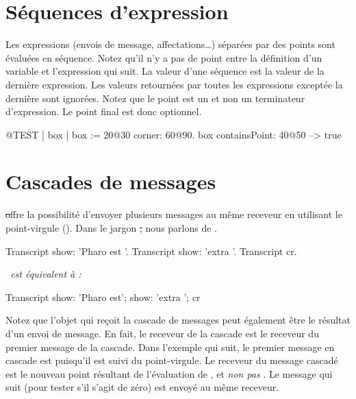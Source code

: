 \documentclass[a4paper,10pt,twoside]{book}
\begin{document}
\section{S\'equences d'expression}
Les expressions (\ie envois de message, affectations\ldots) s\'epar\'ees par des points sont \'evalu\'ees en s\'equence.
Notez qu'il n'y a pas de point entre la d\'efinition d'un variable et l'expression qui suit.
La valeur d'une s\'equence est la valeur de la derni\`ere
expression. Les valeurs retourn\'ees par toutes les expressions
except\'ee la derni\`ere sont ignor\'ees. Notez que le point est un 
et non un terminateur d'expression. Le point final est donc optionnel.

\begin{code}{@TEST}
| box |
box := 20@30 corner: 60@90.
box containsPoint: 40@50 --> true
\end{code}

\section{Cascades de messages}
\st offre la possibilit\'e d'envoyer plusieurs messages au m\^eme
receveur en utilisant le point-virgule (\ct{;}). Dans le jargon \st,
nous parlons de .


\begin{minipage}{0.35\textwidth}
\begin{code}{}
Transcript show: 'Pharo est '.
Transcript show: 'extra '.
Transcript cr.
\end{code}
\end{minipage}
\emph{~est \'equivalent \`a :~}
\begin{minipage}{0.35\textwidth}
\begin{code}{}
Transcript        
   show: 'Pharo est';
   show: 'extra ';
   cr
\end{code}
\end{minipage}

Notez que l'objet qui re\c{c}oit la cascade de messages peut \'egalement \^etre le r\'esultat d'un envoi de message.
En fait, le receveur de la cascade est le receveur du premier message
de la cascade. Dans l'exemple qui suit, le premier message en cascade
est  puisqu'il est suivi du point-virgule. Le receveur
du message cascad\'e  est le nouveau point r\'esultant
de l'\'evaluation de , et \emph{non pas} . Le
message qui suit  (pour tester s'il s'agit de z\'ero) est
envoy\'e au m\^eme receveur. 
\end{document}
